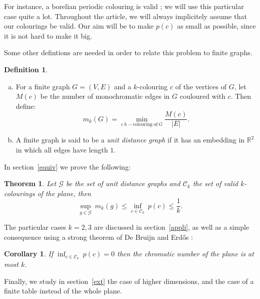 \documentclass[a4paper,11pt]{article}
\newtheorem{cons}{Corollary}
\newtheorem{theo}{Theorem}
\theoremstyle{definition}
\newtheorem{definition}{Definition}
\theoremstyle{remark}
\begin{document}
For instance, a borelian periodic colouring is valid ; we will use this
particular case quite a lot.
Throughout the article, we will always implicitely assume that our colourings be
valid. Our aim will be to make $p(c)$ as small as possible, since it is not hard
to make it big.

Some other defintions are needed in order to relate this problem to finite
graphs.
\begin{definition}
\ 
\begin{enumerate}[a)]
\item For a finite graph $G=(V,E)$ and a $k$-colouring $c$ of the vertices of $G$, 
let $M(c)$ be the number of monochromatic edges in $G$ couloured with $c$.
Then define:
\[m_k(G) = \min_{c \ k-\mathrm{colouring \ of} \ G} \frac{M(c)}{|E|}.\]
\item A finite graph is said to be a \emph{unit distance graph} if it has 
an embedding in $\mathbb{R}^2$ in which all edges have length $1$.
\end{enumerate}
\end{definition}
In section~\ref{equiv} we prove the following:
\begin{theo} \label{ineg}
Let $\mathcal{G}$ be the set of unit distance graphs and $\mathcal{C}_k$ the set 
of valid $k$-colourings of the plane, then
$$ \sup_{g \in \mathcal{G}} \ m_k(g) \leq \inf_{c \in \mathcal{C}_k} \ p(c) \leq \frac{1}{k}. $$
\end{theo}

The particular cases $k=2,3$ are discussed in section~\ref{appli}, as well as a 
simple consequence using a strong theorem of De Bruijn and Erd\H{o}s :
\begin{cons}\label{con}
If $\inf_{c \in \mathcal{C}_k} \ p(c) = 0$ then the chromatic number of the
plane is at most $k$.
\end{cons}
Finally, we study in section~\ref{ext} the case of higher dimensions, and the
case of a finite table instead of the whole plane.
\end{document}
